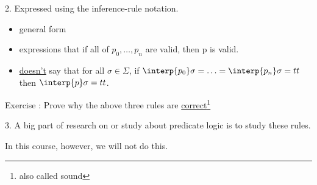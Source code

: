 \documentclass{report}[12pt]
\begin{document}
2. Expressed using the inference-rule notation.

\begin{itemize}
    \item general form
    \item expressions that if all of $p_0, \ldots, p_n$ are valid, then p is valid.
    \item \underline{doesn't} say that for all $\sigma \in \Sigma$, if $\interp{ p_0 } \sigma = \ldots = \interp{ p_n } \sigma = tt$ then $\interp{ p } \sigma = tt$.
\end{itemize}
Exercise : Prove why the above three rules are \underline{correct}\footnote{also called sound}

3. A big part of research on or study about predicate logic is to study these rules.

In this course, however, we will not do this.
\end{document}
